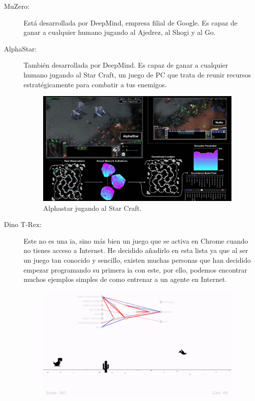 \begin{description}
	\item[MuZero:] Está desarrollada por DeepMind, empresa filial de  Google. Es capaz de ganar a cualquier humano jugando al Ajedrez, al Shogi y al Go.
	\item[AlphaStar:] También desarrollada por DeepMind. Es capaz de ganar a cualquier humano jugando al Star Craft, un juego de PC que trata de reunir recursos estratégicamente para combatir a tus enemigos.
	\begin{figure}[H]
		\centering
		\includegraphics[width=15cm]{archivos/imagenes/alphastar-playing.png}
		\caption[Alphastar jugando al Star Craft.]{Alphastar jugando al Star Craft\footnotemark.}
	\end{figure}
	\item[Dino T-Rex:] Este no es una \gls{ia}, sino más bien un juego que se activa en Chrome cuando no tienes acceso a Internet. He decidido añadirlo en esta lista ya que al ser un juego tan conocido y sencillo, existen muchas personas que han decidido empezar programando su primera \gls{ia} con este, por ello, podemos encontrar muchos ejemplos simples de como entrenar a un agente en Internet.
	\begin{figure}[H]
		\centering
		\includegraphics[width=15cm]{archivos/imagenes/dino-trex-ia.png}

\end{figure}
\end{description}
